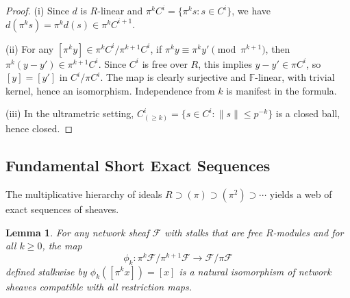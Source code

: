 \documentclass[11pt]{amsart}
\theoremstyle{plain}
\newtheorem{lemma}[theorem]{Lemma}
\theoremstyle{definition}
\newcommand{\Ring}{R}                          %
\newcommand{\unif}{\pi}                        %
\newcommand{\sheaf}[1]{\mathcal{#1}}                  %
\newcommand{\coboundary}{d}                           %
\begin{document}
\begin{proof}
(i) Since $\coboundary$ is $\Ring$-linear and $\unif^k C^i = \{\unif^k s : s \in C^i\}$, 
we have $\coboundary(\unif^k s) = \unif^k \coboundary(s) \in \unif^k C^{i+1}$.

(ii) For any $[\unif^k y] \in \unif^k C^i/\unif^{k+1} C^i$, if $\unif^k y \equiv 
\unif^k y' \pmod{\unif^{k+1}}$, then $\unif^k(y-y') \in \unif^{k+1} C^i$. Since 
$C^i$ is free over $\Ring$, this implies $y - y' \in \unif C^i$, so $[y] = [y']$ 
in $C^i/\unif C^i$. The map is clearly surjective and $\mathbb{F}$-linear, with 
trivial kernel, hence an isomorphism. Independence from $k$ is manifest in the 
formula.

(iii) In the ultrametric setting, $C^i_{(\geq k)} = \{s \in C^i : \|s\| \leq p^{-k}\}$ 
is a closed ball, hence closed.
\end{proof}

\subsection{Fundamental Short Exact Sequences}
\label{ssec:fundamental-ses}

The multiplicative hierarchy of ideals $\Ring \supset (\unif) \supset (\unif^2) 
\supset \cdots$ yields a web of exact sequences of sheaves.

\begin{lemma}
\label{lem:sheaf-filtration-iso}
For any network sheaf $\sheaf{F}$ with stalks that are free $\Ring$-modules and for all $k \geq 0$, the map
\[
\phi_k: \unif^k\sheaf{F}/\unif^{k+1}\sheaf{F} \longrightarrow \sheaf{F}/\unif\sheaf{F}
\]
defined stalkwise by $\phi_k([\unif^k x]) = [x]$ is a natural isomorphism of network sheaves compatible with all restriction maps.
\end{lemma}
\end{document}
